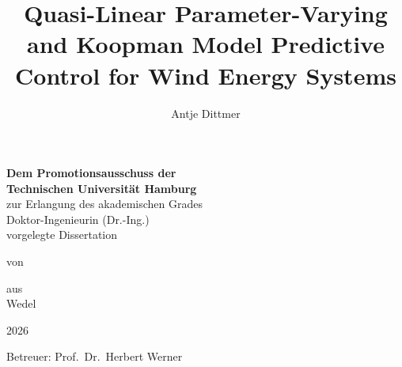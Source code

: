 \documentclass[12pt,a4paper,twoside,openright]{report}
\title{Quasi-Linear Parameter-Varying and Koopman Model Predictive Control for Wind Energy Systems}
\author{Antje Dittmer}
\begin{document}
    \makeatletter
    \begin{titlepage}
        \begin{center}
            \vspace*{1cm}
            \LARGE
            \textbf{\@title}
            
            \vspace{2.5cm}
            \large
            \textbf{Dem Promotionsausschuss der\\
                Technischen Universität Hamburg}\\[1ex]
            zur Erlangung des akademischen Grades\\[1ex]
            Doktor-Ingenieurin (Dr.-Ing.)\\[5ex]
            vorgelegte Dissertation
            
            \vspace{1.5cm}
            von\\ \@author
            
            \vspace{2cm}
            aus\\ Wedel
            
            \vspace{2cm}
            2026 %
        \end{center}
        \vfill
        Betreuer: Prof.\ Dr.\ Herbert Werner
    \end{titlepage}
    \makeatother
    

 \clearpage
 \pagestyle{empty}   %
 ~
 
 
 
\end{document}
